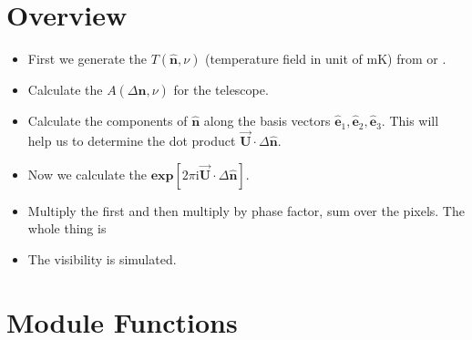 \documentclass[a4paper,11pt,oneside,english,openany]{sphinxmanual}
\begin{document}
\section{Overview}
\label{\detokenize{simvis:overview}}\begin{itemize}
\item {} 
\sphinxAtStartPar
First we generate the  \(T(\hat{\mathbf{n}},\nu)\)  (temperature field in unit of mK) from   or .

\item {} 
\sphinxAtStartPar
Calculate the  \({A}(\Delta\hat{\mathbf{n}},\nu)\) for the telescope.

\item {} 
\sphinxAtStartPar
Calculate the components of \(\hat{\mathbf{n}}\) along the basis vectors \(\hat{\mathbf{e}}_1,\hat{\mathbf{e}}_2,\hat{\mathbf{e}}_3\). This will help us to determine the dot product \(\vec{\textbf{U}}\cdot\Delta\hat{\mathbf{n}}\).

\item {} 
\sphinxAtStartPar
Now we calculate the  \(\textbf{exp}\left[{2\pi \text{i}\vec{\textbf{U}}\cdot\Delta\hat{\mathbf{n}}}\right]\).

\item {} 
\sphinxAtStartPar
Multiply the  first and then multiply by phase factor, sum over the pixels. The whole thing is 

\item {} 
\sphinxAtStartPar
The visibility is simulated.

\end{itemize}

\clearpage


\section{Module Functions}
\label{\detokenize{simvis:module-functions}}
\end{document}
